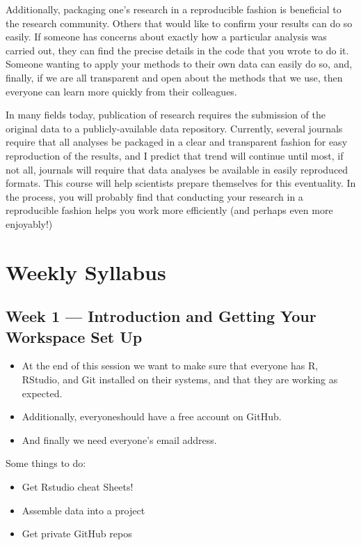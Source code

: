 \documentclass[]{book}
\providecommand{\tightlist}{%
  \setlength{\itemsep}{0pt}\setlength{\parskip}{0pt}}
\theoremstyle{definition}
\theoremstyle{definition}
\theoremstyle{remark}
\begin{document}
Additionally, packaging one's research in a reproducible fashion is
beneficial to the research community. Others that would like to confirm
your results can do so easily. If someone has concerns about exactly how
a particular analysis was carried out, they can find the precise details
in the code that you wrote to do it. Someone wanting to apply your
methods to their own data can easily do so, and, finally, if we are all
transparent and open about the methods that we use, then everyone can
learn more quickly from their colleagues.

In many fields today, publication of research requires the submission of
the original data to a publicly-available data repository. Currently,
several journals require that all analyses be packaged in a clear and
transparent fashion for easy reproduction of the results, and I predict
that trend will continue until most, if not all, journals will require
that data analyses be available in easily reproduced formats. This
course will help scientists prepare themselves for this eventuality. In
the process, you will probably find that conducting your research in a
reproducible fashion helps you work more efficiently (and perhaps even
more enjoyably!)

\section{Weekly Syllabus}\label{weekly-syllabus}

\subsection{Week 1 --- Introduction and Getting Your Workspace Set
Up}\label{week-1-introduction-and-getting-your-workspace-set-up}

\begin{itemize}
\tightlist
\item
  At the end of this session we want to make sure that everyone has R,
  RStudio, and Git installed on their systems, and that they are working
  as expected.
\item
  Additionally, everyoneshould have a free account on GitHub.
\item
  And finally we need everyone's email address.
\end{itemize}

Some things to do:

\begin{itemize}
\tightlist
\item
  Get Rstudio cheat Sheets!
\item
  Assemble data into a project
\item
  Get private GitHub repos
\end{itemize}
\end{document}
